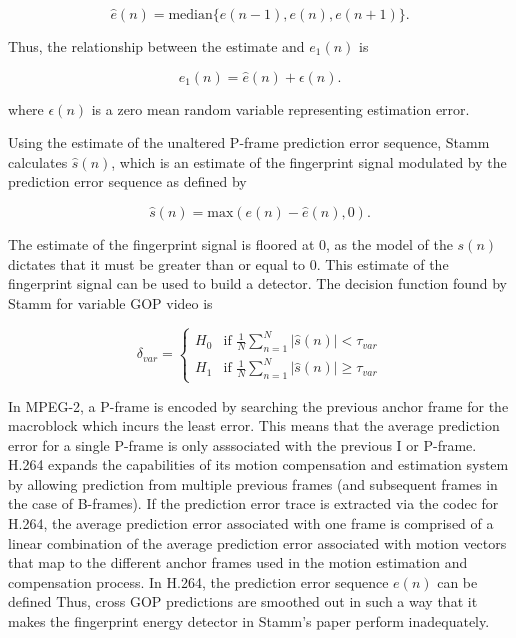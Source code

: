 \begin{equation}
\hat{e}(n) = \text{median}\{ e(n-1), e(n), e(n+1) \}.
\end{equation}

Thus, the relationship between the estimate and $e_{1}(n)$ is

\begin{equation}
e_{1}(n) = \hat{e}(n) + \epsilon(n).
\end{equation}

where $\epsilon(n)$ is a zero mean random variable representing estimation error.

Using the estimate of the unaltered P-frame prediction error sequence, Stamm calculates $\hat{s}(n)$, which is an estimate of the fingerprint signal modulated by the prediction error sequence as defined by

\begin{equation}
\hat{s}(n) = \text{max}(e(n) - \hat{e}(n), 0).
\end{equation}

The estimate of the fingerprint signal is floored at 0, as the model of the $s(n)$ dictates that it must be greater than or equal to 0. This estimate of the fingerprint signal can be used to build a detector. The decision function found by Stamm for variable GOP video is

\begin{equation}
\delta_{var} =
\begin{cases}
  H_{0} & \text{if } \frac{1}{N} \sum_{n=1}^{N} \vert \hat{s}(n) \vert < \tau_{var} \\
  H_{1} & \text{if } \frac{1}{N} \sum_{n=1}^{N} \vert \hat{s}(n) \vert \geq \tau_{var}
\end{cases}
\end{equation}

In MPEG-2, a P-frame is encoded by searching the previous anchor frame for the macroblock which incurs the least error. This means that the average prediction error for a single P-frame is only asssociated with the previous I or P-frame. H.264 expands the capabilities of its motion compensation and estimation system by allowing prediction from multiple previous frames (and subsequent frames in the case of B-frames). If the prediction error trace is extracted via the codec for H.264, the average prediction error associated with one frame is comprised of a linear combination of the average prediction error associated with motion vectors that map to the different anchor frames used in the motion estimation and compensation process. In H.264, the prediction error sequence $e(n)$ can be defined Thus, cross GOP predictions are smoothed out in such a way that it makes the fingerprint energy detector in Stamm's paper perform inadequately.

